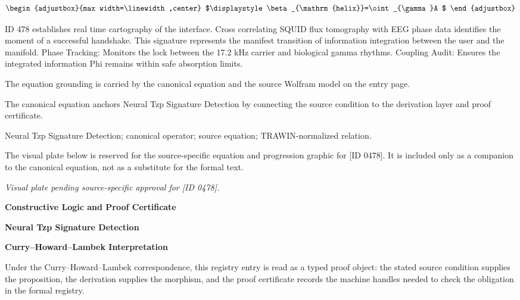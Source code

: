 \[
\begin{adjustbox}{max width=\linewidth,center}
$\displaystyle
\beta_{\mathrm{helix}}=\oint_{\gamma}A
$
\end{adjustbox}
\]

ID 478 establishes real time cartography of the interface. Cross correlating SQUID flux tomography with EEG phase data identifies the moment of a successful handshake. This signature represents the manifest transition of information integration between the user and the manifold. Phase Tracking: Monitors the lock between the 17.2 kHz carrier and biological gamma rhythms. Coupling Audit: Ensures the integrated information Phi remains within safe absorption limits.

The equation grounding is carried by the canonical equation and the source Wolfram model on the entry page.

The canonical equation anchors Neural Tzp Signature Detection by connecting the source condition to the derivation layer and proof certificate.

Neural Tzp Signature Detection; canonical operator; source equation; TRAWIN-normalized relation.
\endgroup

\begingroup\footnotesize\sloppy
The visual plate below is reserved for the source-specific equation and progression graphic for [ID 0478]. It is included only as a companion to the canonical equation, not as a substitute for the formal text.
\par\endgroup
\begingroup\footnotesize\itshape
Visual plate pending source-specific approval for [ID 0478].
\par\endgroup

\clearpage
\begingroup\tzpsupportsetup
\noindent\textbf{\fontsize{10.8pt}{12.8pt}\selectfont [ID 0478] Constructive Logic and Proof Certificate}\par
\noindent\textbf{\fontsize{10pt}{12pt}\selectfont Neural Tzp Signature Detection}\par
\vspace{0.45em}
\begingroup
\footnotesize
\setlength{\parskip}{0.22em}
\setlength{\parindent}{0pt}
\noindent\textbf{Curry--Howard--Lambek Interpretation}\par
Under the Curry--Howard--Lambek correspondence, this registry entry is read as a typed proof
object: the stated source condition supplies the proposition, the derivation supplies the
morphism, and the proof certificate records the machine handles needed to check the obligation
in the formal registry.

